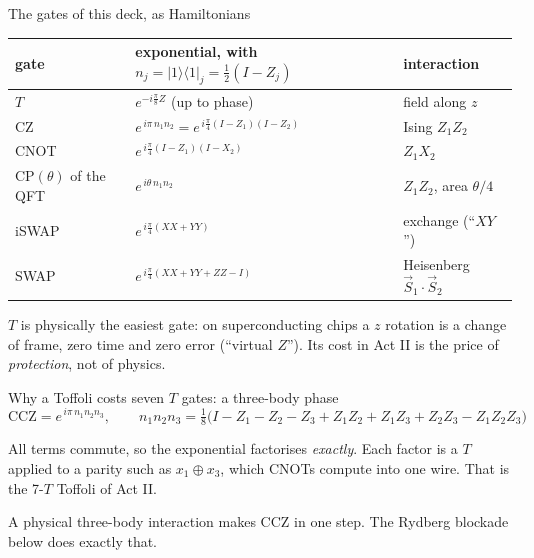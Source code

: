 \documentclass[aspectratio=169,11pt]{beamer}
\newcommand{\ket}[1]{|#1\rangle}
\newcommand{\bra}[1]{\langle#1|}
\begin{document}
\begin{frame}{The gates of this deck, as Hamiltonians}
  \centering
  \renewcommand{\arraystretch}{1.25}
  \begin{tabular}{@{}lll@{}}
    \toprule
    gate & exponential, with $n_j=\ket1\!\bra1_j=\tfrac12(I-Z_j)$ & interaction \\
    \midrule
    $T$ & $e^{-i\frac\pi8Z}$ (up to phase) & field along $z$ \\
    CZ & $e^{\,i\pi\,n_1n_2}=e^{\,i\frac\pi4(I-Z_1)(I-Z_2)}$ & Ising $Z_1Z_2$ \\
    CNOT & $e^{\,i\frac\pi4(I-Z_1)(I-X_2)}$ & $Z_1X_2$ \\
    $\mathrm{CP}(\theta)$ of the QFT & $e^{\,i\theta\,n_1n_2}$ & $Z_1Z_2$, area $\theta/4$ \\
    iSWAP & $e^{\,i\frac\pi4(XX+YY)}$ & exchange (``$XY$'') \\
    SWAP & $e^{\,i\frac\pi4(XX+YY+ZZ-I)}$ & Heisenberg $\vec S_1\!\cdot\vec S_2$ \\
    \bottomrule
  \end{tabular}
  \raggedright
  \begin{takeaway}$T$ is physically the easiest gate: on superconducting chips a $z$ rotation is a change of frame, zero time and zero error (``virtual $Z$''). Its cost in Act II is the price of \emph{protection}, not of physics.\end{takeaway}
\end{frame}

\begin{frame}{Why a Toffoli costs seven $T$ gates: a three-body phase}
  \[ \mathrm{CCZ}=e^{\,i\pi\,n_1n_2n_3},\qquad
     n_1n_2n_3=\tfrac18\big(I-Z_1-Z_2-Z_3+Z_1Z_2+Z_1Z_3+Z_2Z_3-Z_1Z_2Z_3\big) \]
  \vskip1mm
  \centering
  \vskip2mm
  \raggedright
  All terms commute, so the exponential factorises \emph{exactly}. Each factor is a $T$ applied to a parity such as $x_1\oplus x_3$, which CNOTs compute into one wire. That is the 7-$T$ Toffoli of Act II.
  \begin{takeaway}A physical three-body interaction makes CCZ in one step. The Rydberg blockade below does exactly that.\end{takeaway}
\end{frame}
\end{document}
